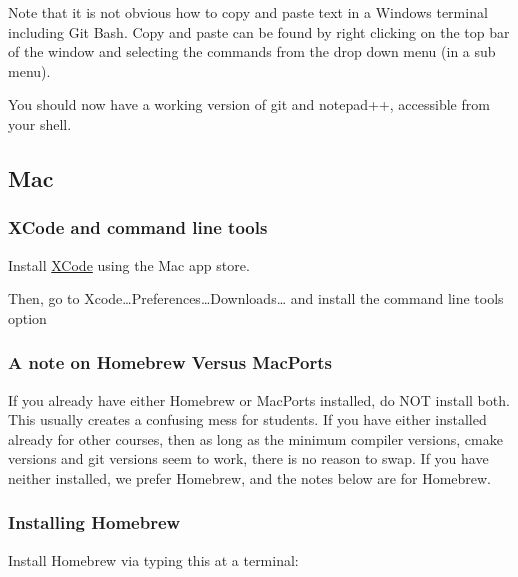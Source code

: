 Note that it is not obvious how to copy and paste text in a Windows
terminal including Git Bash. Copy and paste can be found by right
clicking on the top bar of the window and selecting the commands from
the drop down menu (in a sub menu).

You should now have a working version of git and notepad++, accessible
from your shell.

\subsection{Mac}\label{mac}

\subsubsection{XCode and command line
tools}\label{xcode-and-command-line-tools}

Install \href{https://itunes.apple.com/us/app/xcode/id497799835}{XCode}
using the Mac app store.

Then, go to Xcode\ldots{}Preferences\ldots{}Downloads\ldots{} and
install the command line tools option

\subsubsection{A note on Homebrew Versus
MacPorts}\label{a-note-on-homebrew-versus-macports}

If you already have either Homebrew or MacPorts installed, do NOT
install both. This usually creates a confusing mess for students. If you
have either installed already for other courses, then as long as the
minimum compiler versions, cmake versions and git versions seem to work,
there is no reason to swap. If you have neither installed, we prefer
Homebrew, and the notes below are for Homebrew.

\subsubsection{Installing Homebrew}\label{installing-homebrew}

Install Homebrew via typing this at a terminal:

\begin{Shaded}
\begin{Highlighting}[]
 \OtherTok{$(} \OtherTok{)}
\end{Highlighting}
\end{Shaded}

